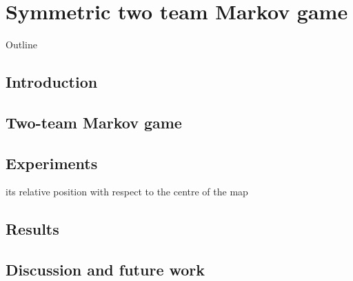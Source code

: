 \chapter{Symmetric two team Markov game}\label{ch:2teams}
\begin{chapter_outline}
Outline \citep{leroy2022twoteam}
\end{chapter_outline}

\section{Introduction}
\section{Two-team Markov game}
\section{Experiments}
its relative position with respect to the centre of the map 
\section{Results}
\section{Discussion and future work}
